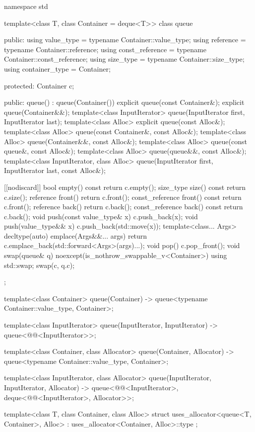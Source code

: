 \begin{codeblock}
namespace std {
  template<class T, class Container = deque<T>>
  class queue {
  public:
    using value_type      = typename Container::value_type;
    using reference       = typename Container::reference;
    using const_reference = typename Container::const_reference;
    using size_type       = typename Container::size_type;
    using container_type  =          Container;

  protected:
    Container c;

  public:
    queue() : queue(Container()) {}
    explicit queue(const Container&);
    explicit queue(Container&&);
    template<class InputIterator> queue(InputIterator first, InputIterator last);
    template<class Alloc> explicit queue(const Alloc&);
    template<class Alloc> queue(const Container&, const Alloc&);
    template<class Alloc> queue(Container&&, const Alloc&);
    template<class Alloc> queue(const queue&, const Alloc&);
    template<class Alloc> queue(queue&&, const Alloc&);
    template<class InputIterator, class Alloc>
      queue(InputIterator first, InputIterator last, const Alloc&);

    [[nodiscard]] bool empty() const    { return c.empty(); }
    size_type         size()  const     { return c.size(); }
    reference         front()           { return c.front(); }
    const_reference   front() const     { return c.front(); }
    reference         back()            { return c.back(); }
    const_reference   back() const      { return c.back(); }
    void push(const value_type& x)      { c.push_back(x); }
    void push(value_type&& x)           { c.push_back(std::move(x)); }
    template<class... Args>
      decltype(auto) emplace(Args&&... args)
        { return c.emplace_back(std::forward<Args>(args)...); }
    void pop()                          { c.pop_front(); }
    void swap(queue& q) noexcept(is_nothrow_swappable_v<Container>)
      { using std::swap; swap(c, q.c); }
  };

  template<class Container>
    queue(Container) -> queue<typename Container::value_type, Container>;

  template<class InputIterator>
    queue(InputIterator, InputIterator) -> queue<@@<InputIterator>>;

  template<class Container, class Allocator>
    queue(Container, Allocator) -> queue<typename Container::value_type, Container>;

  template<class InputIterator, class Allocator>
    queue(InputIterator, InputIterator, Allocator)
      -> queue<@@<InputIterator>, deque<@@<InputIterator>,
               Allocator>>;

  template<class T, class Container, class Alloc>
    struct uses_allocator<queue<T, Container>, Alloc>
      : uses_allocator<Container, Alloc>::type { };
}
\end{codeblock}

